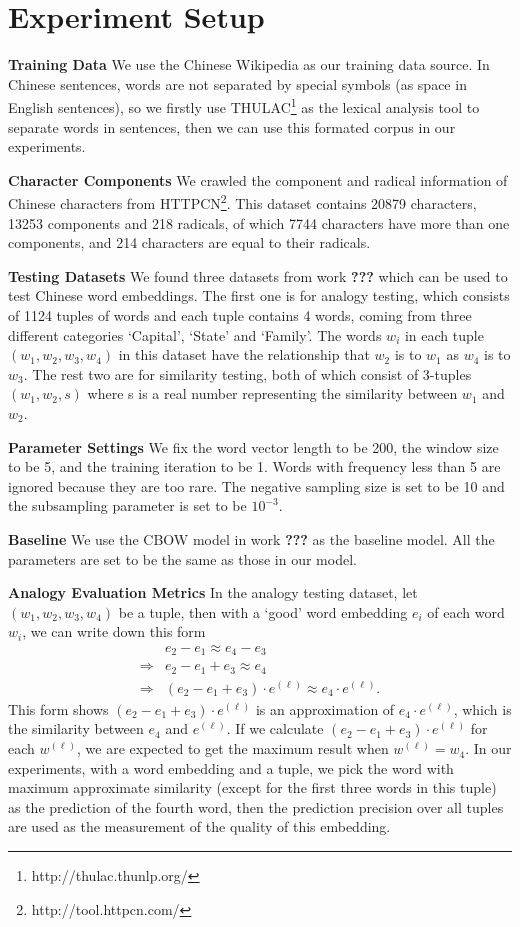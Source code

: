 \section{Experiment Setup}

\textbf{Training Data} We use the Chinese Wikipedia as our training data source. In Chinese sentences, words are not separated by special symbols (as space in English sentences), so we firstly use THULAC\footnote{http://thulac.thunlp.org/} as the lexical analysis tool to separate words in sentences, then we can use this formated corpus in our experiments.

\textbf{Character Components} We crawled the component and radical information of Chinese characters from HTTPCN\footnote{http://tool.httpcn.com/}. This dataset contains 20879 characters, 13253 components and 218 radicals, of which 7744 characters have more than one components, and 214 characters are equal to their radicals.

\textbf{Testing Datasets} We found three datasets from work \textbf{???} which can be used to test Chinese word embeddings. The first one is for analogy testing, which consists of 1124 tuples of words and each tuple contains 4 words, coming from three different categories `Capital', `State' and `Family'. The words $w_i$ in each tuple $(w_1, w_2, w_3, w_4)$ in this dataset have the relationship that $w_2$ is to $w_1$ as $w_4$ is to $w_3$. The rest two are for similarity testing, both of which consist of 3-tuples $(w_1, w_2, s)$ where s is a real number representing the similarity between $w_1$ and $w_2$.

\textbf{Parameter Settings} We fix the word vector length to be 200, the window size to be 5, and the training iteration to be 1. Words with frequency less than 5 are ignored because they are too rare. The negative sampling size is set to be 10 and the subsampling parameter is set to be $10^{-3}$.

\textbf{Baseline} We use the CBOW model in work \textbf{???} as the baseline model. All the parameters are set to be the same as those in our model.

\textbf{Analogy Evaluation Metrics} In the analogy testing dataset, let $(w_1, w_2, w_3, w_4)$ be a tuple, then with a `good' word embedding $e_i$ of each word $w_i$, we can write down this form
\begin{align*}
	& e_2 - e_1 \approx e_4 - e_3 \\
	\Rightarrow & e_2 - e_1 + e_3 \approx e_4 \\
	\Rightarrow & (e_2 - e_1 + e_3)\cdot e^{(\ell)} \approx e_4\cdot e^{(\ell)}.
\end{align*}
This form shows $(e_2 - e_1 + e_3)\cdot e^{(\ell)}$ is an approximation of $e_4\cdot e^{(\ell)}$, which is the similarity between $e_4$ and $e^{(\ell)}$. If we calculate $(e_2 - e_1 + e_3)\cdot e^{(\ell)}$ for each $w^{(\ell)}$, we are expected to get the maximum result when $w^{(\ell)}=w_4$. In our experiments, with a word embedding and a tuple, we pick the word with maximum approximate similarity (except for the first three words in this tuple) as the prediction of the fourth word, then the prediction precision over all tuples are used as the measurement of the quality of this embedding.

